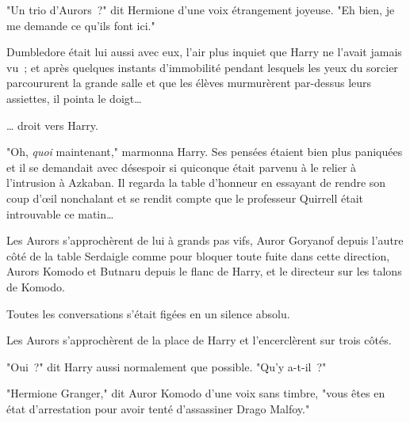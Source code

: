 "Un trio d'Aurors~?" dit Hermione d'une voix étrangement joyeuse. "Eh bien, je me demande ce qu'ils font ici."

Dumbledore était lui aussi avec eux, l'air plus inquiet que Harry ne l'avait jamais vu~; et après quelques instants d'immobilité pendant lesquels les yeux du sorcier parcoururent la grande salle et que les élèves murmurèrent par-dessus leurs assiettes, il pointa le doigt…

… droit vers Harry.

"Oh, \emph{quoi} maintenant," marmonna Harry. Ses pensées étaient bien plus paniquées et il se demandait avec désespoir si quiconque était parvenu à le relier à l'intrusion à Azkaban. Il regarda la table d'honneur en essayant de rendre son coup d'œil nonchalant et se rendit compte que le professeur Quirrell était introuvable ce matin…

Les Aurors s'approchèrent de lui à grands pas vifs, Auror Goryanof depuis l'autre côté de la table Serdaigle comme pour bloquer toute fuite dans cette direction, Aurors Komodo et Butnaru depuis le flanc de Harry, et le directeur sur les talons de Komodo.

Toutes les conversations s'était figées en un silence absolu.

Les Aurors s'approchèrent de la place de Harry et l'encerclèrent sur trois côtés.

"Oui~?" dit Harry aussi normalement que possible. "Qu'y a-t-il~?"

"Hermione Granger," dit Auror Komodo d'une voix sans timbre, "vous êtes en état d'arrestation pour avoir tenté d'assassiner Drago Malfoy." 

